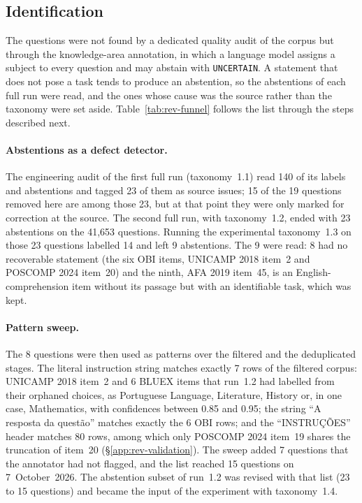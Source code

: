 \subsection{Identification}
\label{app:rev-identification}

The questions were not found by a dedicated quality audit of the corpus but
through the knowledge-area annotation, in which a language model assigns a
subject to every question and may abstain with \texttt{UNCERTAIN}. A
statement that does not pose a task tends to produce an abstention, so the
abstentions of each full run were read, and the ones whose cause was the
source rather than the taxonomy were set aside. Table~\ref{tab:rev-funnel}
follows the list through the steps described next.

\paragraph{Abstentions as a defect detector.} The engineering audit of the
first full run (taxonomy~1.1) read 140 of its labels and abstentions and
tagged 23 of them as source issues; 15 of the 19 questions removed here are
among those 23, but at that point they were only marked for correction at the
source. The second full run, with taxonomy~1.2, ended with 23 abstentions on
the 41,653 questions. Running the experimental taxonomy~1.3 on those 23
questions labelled 14 and left 9 abstentions. The 9 were read: 8 had no
recoverable statement (the six OBI items, UNICAMP 2018 item~2 and POSCOMP 2024
item~20) and the ninth, AFA 2019 item~45, is an English-comprehension item
without its passage but with an identifiable task, which was kept.

\paragraph{Pattern sweep.} The 8 questions were then used as patterns over
the filtered and the deduplicated stages. The literal instruction string
matches exactly 7 rows of the filtered corpus: UNICAMP 2018 item~2 and 6
BLUEX items that run~1.2 had labelled from their orphaned choices, as
Portuguese Language, Literature, History or, in one case, Mathematics, with
confidences between 0.85 and 0.95; the string ``A resposta da questão''
matches exactly the 6 OBI rows; and the ``INSTRUÇÕES'' header matches 80
rows, among which only POSCOMP 2024 item~19 shares the truncation of item~20
(\S\ref{app:rev-validation}). The sweep added 7 questions that the annotator
had not flagged, and the list reached 15 questions on 7~October~2026. The
abstention subset of run~1.2 was revised with that list (23 to 15 questions)
and became the input of the experiment with taxonomy~1.4.

